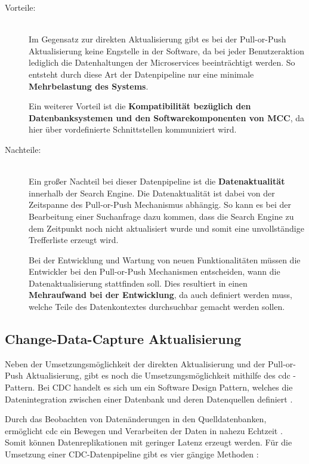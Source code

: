 \begin{description}
    \item[Vorteile:]\hfill \\
    Im Gegensatz zur direkten Aktualisierung gibt es bei der Pull-or-Push Aktualisierung keine Engstelle in der Software, da bei jeder Benutzeraktion lediglich die Datenhaltungen der Microservices beeinträchtigt werden. So entsteht durch diese Art der Datenpipeline nur eine minimale \textbf{Mehrbelastung des Systems}.

    Ein weiterer Vorteil ist die \textbf{Kompatibilität bezüglich den Datenbanksystemen und den Softwarekomponenten von MCC}, da hier über vordefinierte Schnittstellen kommuniziert wird.
    
    \item[Nachteile:]\hfill \\
    Ein großer Nachteil bei dieser Datenpipeline ist die \textbf{Datenaktualität} innerhalb der Search Engine. Die Datenaktualität ist dabei von der Zeitspanne des Pull-or-Push Mechanismus abhängig. So kann es bei der Bearbeitung einer Suchanfrage dazu kommen, dass die Search Engine zu dem Zeitpunkt noch nicht aktualisiert wurde und somit eine unvollständige Trefferliste erzeugt wird.

    Bei der Entwicklung und Wartung von neuen Funktionalitäten müssen die Entwickler bei den Pull-or-Push Mechanismen entscheiden, wann die Datenaktualisierung stattfinden soll. Dies resultiert in einen \textbf{Mehraufwand bei der Entwicklung}, da auch definiert werden muss, welche Teile des Datenkontextes \glqq durchsuchbar\grqq{} gemacht werden sollen.

\end{description}

\subsection{Change-Data-Capture Aktualisierung\label{subsec4.3.4:Unterunterpunkt-4}}

Neben der Umsetzungsmöglichkeit der direkten Aktualisierung und der Pull-or-Push Aktualisierung, gibt es noch die Umsetzungsmöglichkeit mithilfe des \gls{cdc} - Pattern. Bei CDC handelt es sich um ein Software Design Pattern, welches die Datenintegration zwischen einer Datenbank und deren Datenquellen definiert \cite{Datenbankenverstehen.de.2021}.

Durch das Beobachten von Datenänderungen in den Quelldatenbanken, ermöglicht \gls{cdc} ein Bewegen und Verarbeiten der Daten in nahezu Echtzeit \cite{JohnKutay.2021}. Somit können Datenreplikationen mit geringer Latenz erzeugt werden. Für die Umsetzung einer CDC-Datenpipeline gibt es vier gängige Methoden \cite{MarkVandeWiel.2021}:

